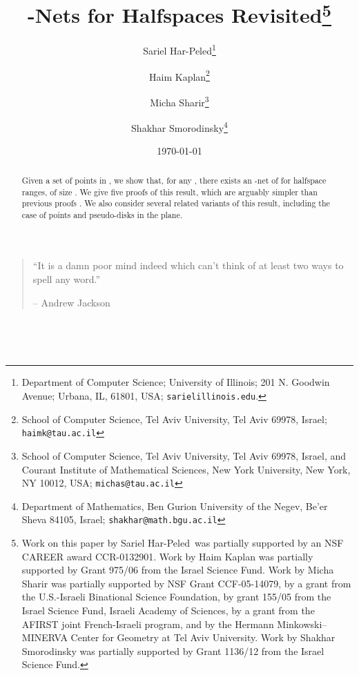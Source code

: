 \documentclass[12pt]{article}
\newcommand{\atgen}{\symbol{'100}}
\newcommand{\SarielThanks}[1]{\thanks{Department of Computer Science;
      University of Illinois; 201 N. Goodwin Avenue; Urbana, IL,
      61801, USA; {\tt sariel\atgen{}illinois.edu}.} #1}
\newcommand{\si}[1]{#1}
\begin{document}
\title{-Nets for Halfspaces Revisited\thanks{Work on this paper by Sariel Har-Peled~was partially supported
      by an NSF CAREER award CCR-0132901.  Work by Haim Kaplan was
      partially supported by Grant 975/06 from the Israel Science
      Fund. Work by Micha Sharir was partially supported by NSF Grant
      CCF-05-14079, by a grant from the U.S.-Israeli Binational
      Science Foundation, by grant 155/05 from the Israel Science
      Fund, Israeli Academy of Sciences, by a grant from the
      \si{AFIRST} joint French-Israeli program, and by the Hermann
      Minkowski--MINERVA Center for Geometry at Tel Aviv University. Work by Shakhar Smorodinsky was
      partially supported by Grant 1136/12 from the Israel Science
      Fund.}}

\author{
Sariel Har-Peled\SarielThanks{}\and Haim Kaplan\thanks{School of Computer Science, Tel Aviv University, Tel Aviv 69978,
      Israel; \texttt{haimk@tau.ac.il} }\and Micha Sharir\thanks{School of Computer Science, Tel Aviv University, Tel Aviv 69978,
      Israel, and Courant Institute of Mathematical Sciences, New York
      University, New York, NY 10012, USA; \texttt{michas@tau.ac.il} }
   \and Shakhar Smorodinsky\thanks{Department of Mathematics, Ben Gurion University of the Negev,
      Be'er Sheva 84105, Israel; \texttt{shakhar@math.bgu.ac.il} } }

\date{\today}

\maketitle


\begin{center}
    \begin{minipage}[c]{5.0in}
        \footnotesize
        \begin{quotation}
            ``It is a damn poor mind indeed which can't think of
            at least two ways to spell any word.''


            \qquad\qquad\qquad -- \textrm{Andrew Jackson}
        \end{quotation}

        ~

        ~

    \end{minipage}
\end{center}


\begin{abstract}
    Given a set  of  points in , we show that, for any
    , there exists an -net of  for halfspace ranges,
    of size . We give five proofs of this result, which are
    arguably simpler than previous proofs \cite{msw-hnlls-90,
       cv-iaags-07, pr-nepen-08}.  We also consider several related
    variants of this result, including the case of points and
    pseudo-disks in the plane.
\end{abstract}
\end{document}
